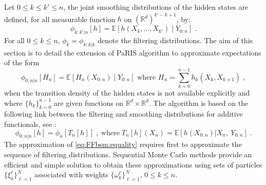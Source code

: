 \documentclass[12pt,draft]{article}
\newcommand{\eqsp}{\;}
\newcommand{\1}{\mathrm{1}}
\newcommand{\E}{\mathbb{E}}
\begin{document}
Let $0 \leq k \leq k' \leq n$, the joint smoothing distributions of the hidden states are defined, for all measurable function $h$ on $(\mathbb{R}^d)^{k'-k + 1}$, by:
\[
\phi_{k:k'|n}[h] = \mathbb{E}\left[h(X_k,\ldots,X_{k'})\middle|Y_{0:n}\right]\eqsp.
\]
For all $0\le k\le n$, $\phi_{k} = \phi_{k:k|k}$ denote the filtering distributions. The aim of this section is to detail the extension of PaRIS algorithm to approximate expectations of the form
\begin{equation}
\label{def:addfunc}
\phi_{0:n\vert n}[H_{n}] = \mathbb{E}\left[H_n(X_{0:n})\middle|Y_{0:n}\right] \text{ where } H_n=\sum_{k=0}^{n-1}h_k(X_k,X_{k+1})\eqsp,
\end{equation}
when the transition density of the hidden states is not available explicitly and where $\{h_k\}_{k=0}^{n-1}$ are given functions on $\mathbb{R}^d\times \mathbb{R}^d$. 
The algorithm is based on the following link between the filtering and smoothing distributions for additive functionals, see \cite{olsson:westerborn:2016}:
\begin{equation}
\phi_{0:n|n}[h] = \phi_n[T_n[h]]\eqsp,\;\mbox{where}\; T_n[h](X_n) = \E\left[h(X_{0:n})\vert X_n,~Y_{0:n}\right]\eqsp.\label{eq:FFbsm:equality}
\end{equation}
The approximation of \eqref{eq:FFbsm:equality} requires first to approximate the sequence of filtering distributions. 
Sequential Monte Carlo methods provide an efficient and simple solution to obtain these approximations using sets of particles $\{\xi^{\ell}_k\}_{\ell=1}^N$ associated with weights $\{\omega^{\ell}_k\}_{\ell=1}^N$, $0\le k \le n$.
\end{document}
